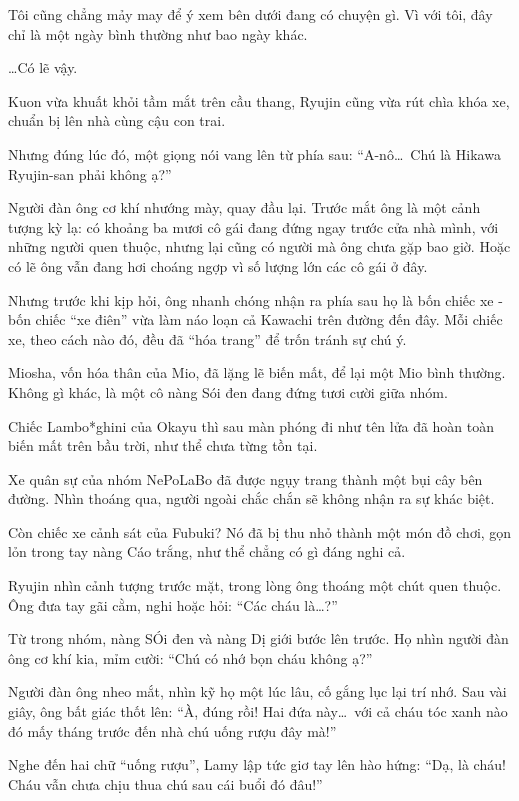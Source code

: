 \documentclass[../main.tex]{subfiles}
\begin{document}
Tôi cũng chẳng mảy may để ý xem bên dưới đang có chuyện gì. Vì với tôi, đây chỉ là một ngày bình thường như bao ngày khác.

\dots Có lẽ vậy.

\pov{-}

Kuon vừa khuất khỏi tầm mắt trên cầu thang, Ryujin cũng vừa rút chìa khóa xe, chuẩn bị lên nhà cùng cậu con trai.

Nhưng đúng lúc đó, một giọng nói vang lên từ phía sau: ``A-nô\dots\ Chú là Hikawa Ryujin-san phải không ạ?''

Người đàn ông cơ khí nhướng mày, quay đầu lại. Trước mắt ông là một cảnh tượng kỳ lạ: có khoảng ba mươi cô gái đang đứng ngay trước cửa nhà mình, với những người quen thuộc, nhưng lại cũng có người mà ông chưa gặp bao giờ. Hoặc có lẽ ông vẫn đang hơi choáng ngợp vì số lượng lớn các cô gái ở đây.

Nhưng trước khi kịp hỏi, ông nhanh chóng nhận ra phía sau họ là bốn chiếc xe - bốn chiếc ``xe điên'' vừa làm náo loạn cả Kawachi trên đường đến đây. Mỗi chiếc xe, theo cách nào đó, đều đã ``hóa trang'' để trốn tránh sự chú ý.

Miosha, vốn hóa thân của Mio, đã lặng lẽ biến mất, để lại một Mio bình thường. Không gì khác, là một cô nàng Sói đen đang đứng tươi cười giữa nhóm.

Chiếc Lambo*ghini của Okayu thì sau màn phóng đi như tên lửa đã hoàn toàn biến mất trên bầu trời, như thể chưa từng tồn tại.

Xe quân sự của nhóm NePoLaBo đã được ngụy trang thành một bụi cây bên đường. Nhìn thoáng qua, người ngoài chắc chắn sẽ không nhận ra sự khác biệt.

Còn chiếc xe cảnh sát của Fubuki? Nó đã bị thu nhỏ thành một món đồ chơi, gọn lỏn trong tay nàng Cáo trắng, như thể chẳng có gì đáng nghi cả.

Ryujin nhìn cảnh tượng trước mặt, trong lòng ông thoáng một chút quen thuộc. Ông đưa tay gãi cằm, nghi hoặc hỏi: ``Các cháu là\dots?''

Từ trong nhóm, nàng SÓi đen và nàng Dị giới bước lên trước. Họ nhìn người đàn ông cơ khí kia, mỉm cười: ``Chú có nhớ bọn cháu không ạ?''

Người đàn ông nheo mắt, nhìn kỹ họ một lúc lâu, cố gắng lục lại trí nhớ. Sau vài giây, ông bất giác thốt lên: ``À, đúng rồi! Hai đứa này\dots\ với cả cháu tóc xanh nào đó mấy tháng trước đến nhà chú uống rượu đây mà!''

Nghe đến hai chữ ``uống rượu'', Lamy lập tức giơ tay lên hào hứng: ``Dạ, là cháu! Cháu vẫn chưa chịu thua chú sau cái buổi đó đâu!''
\end{document}
